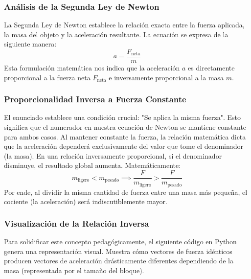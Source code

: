\documentclass[12pt]{article}
\begin{document}
\subsubsection*{Análisis de la Segunda Ley de Newton}
La Segunda Ley de Newton establece la relación exacta entre la fuerza aplicada, la masa del objeto y la aceleración resultante. La ecuación se expresa de la siguiente manera:
\begin{equation}
    a = \frac{F_{\text{neta}}}{m}
\end{equation}
Esta formulación matemática nos indica que la aceleración $a$ es directamente proporcional a la fuerza neta $F_{\text{neta}}$ e inversamente proporcional a la masa $m$. 

\subsubsection*{Proporcionalidad Inversa a Fuerza Constante}
El enunciado establece una condición crucial: "Se aplica la misma fuerza". Esto significa que el numerador en nuestra ecuación de Newton se mantiene constante para ambos casos. Al mantener constante la fuerza, la relación matemática dicta que la aceleración dependerá exclusivamente del valor que tome el denominador (la masa).
En una relación inversamente proporcional, si el denominador disminuye, el resultado global aumenta. Matemáticamente:
\begin{equation}
    m_{\text{ligero}} < m_{\text{pesado}} \implies \frac{F}{m_{\text{ligero}}} > \frac{F}{m_{\text{pesado}}}
\end{equation}
Por ende, al dividir la misma cantidad de fuerza entre una masa más pequeña, el cociente (la aceleración) será indiscutiblemente mayor.

\subsubsection*{Visualización de la Relación Inversa}
Para solidificar este concepto pedagógicamente, el siguiente código en Python genera una representación visual. Muestra cómo vectores de fuerza idénticos producen vectores de aceleración drásticamente diferentes dependiendo de la masa (representada por el tamaño del bloque).
\end{document}
